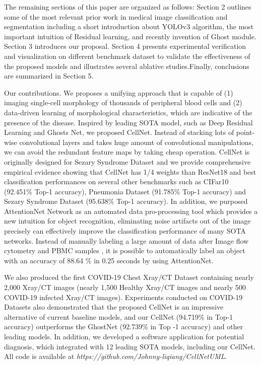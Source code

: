 The remaining sections of this paper are organized as follows: Section 2 outlines some of the most relevant  prior work in medical image classification and segmentation including a short introduction about YOLOv3 \cite{b33} algorithm, the most important intuition of Residual learning, and recently invention of Ghost module.
Section 3 introduces our proposal. Section 4 presents experimental verification  and visualization on different benchmark dataset to validate the effectiveness of the proposed models and illustrates several ablative studies.Finally, conclusions are summarized in Section 5.

Our contributions. We proposes a unifying approach that is capable of (1) imaging single-cell morphology of thousands of peripheral blood cells and (2) data-driven learning of morphological characteristics, which are indicative of the presence of the disease.
Inspired by leading SOTA model, such as Deep Residual Learning\cite{b20} and Ghosts Net\cite{b19}, we proposed CellNet. Instead of stacking lots of point-wise convolutional layers and takes huge amount of convolutional manipulations, we can avoid the redundant feature maps by taking cheap operation. CellNet is originally designed for Sezary Syndrome Dataset and we provide comprehensive empirical evidence showing that CellNet has 1/4 weights than ResNet18 \cite{b20} and best classification performances on 
several other benchmarks such as CIFar10 \cite{b21} (92.451\% Top-1 accuracy), Pneumonia Dataset\cite{b38} (91.785\% Top-1 accuracy) and Sezary Syndrome Dataset (95.638\% Top-1 accuracy).
In addition, we purposed AttentionNet Network as an automated data pro-processing tool which provides a new intuition for object recognition, eliminating noise artifacts out of the image precisely can effectively improve the classification performance of many SOTA networks. Instead of manually labeling a large amount of data after Image flow cytometry and PBMC samples \cite{b12}, it is possible to automatically label an object with an accuracy of 88.64 \% in 0.25 seconds by using AttentionNet. 

We also produced the first COVID-19 Chest Xray/CT Dataset containing nearly 2,000 Xray/CT images (nearly 1,500 Healthy Xray/CT images and nearly 500 COVID-19 infected Xray/CT images). Experiments conducted on COVID-19 Datasets also demonstrated that the proposed CellNet is an impressive alternative of current baseline models, and our CellNet (94.719\% in Top-1 accuracy) outperforms the GhostNet\cite{b19} (92.739\%  in Top -1 accuracy) and other leading models. In addition, we developed a software application for potential diagnosis, which integrated with 12 leading SOTA models, including our CellNet. All code is available at \textit{https://github.com/Johnny-liqiang/CellNetUML}.



